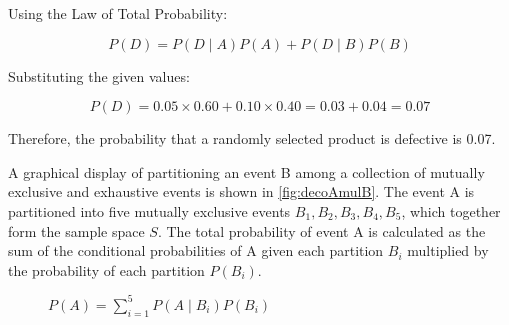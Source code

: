 \begin{solution}
    Using the Law of Total Probability:

    \[
    P(D) = P(D \mid A) P(A) + P(D \mid B) P(B)
    \]

    Substituting the given values:

    \[
    P(D) = 0.05 \times 0.60 + 0.10 \times 0.40 = 0.03 + 0.04 = 0.07
    \]

    Therefore, the probability that a randomly selected product is defective is 0.07.
\end{solution}

A graphical display of partitioning an event B
among a collection of mutually exclusive and exhaustive events is shown in \autoref{fig:decoAmulB}. The event A is partitioned into five mutually exclusive events \( B_1, B_2, B_3, B_4, B_5 \), which together form the sample space \( S \). The total probability of event A is calculated as the sum of the conditional probabilities of A given each partition \( B_i \) multiplied by the probability of each partition \( P(B_i) \).

\begin{figure}[htbp]
    \centering
    \caption{$P(A) = \sum_{i=1}^{5} P(A \mid B_i) P(B_i)$}
    \label{fig:decoAmulB}
\end{figure}

